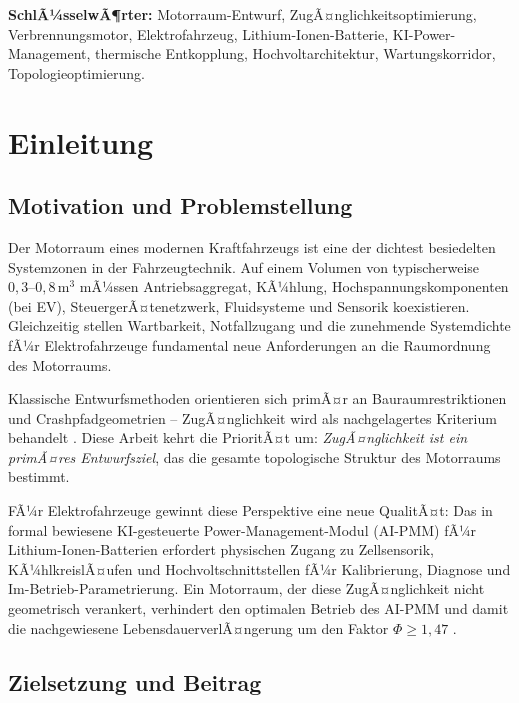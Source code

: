 ﻿\documentclass[12pt,a4paper]{article}
\begin{document}
\vspace{1cm}
\noindent\textbf{SchlÃ¼sselwÃ¶rter:} Motorraum-Entwurf, ZugÃ¤nglichkeitsoptimierung,
Verbrennungsmotor, Elektrofahrzeug, Lithium-Ionen-Batterie, KI-Power-Management,
thermische Entkopplung, Hochvoltarchitektur, Wartungskorridor, Topologieoptimierung.

\newpage
\tableofcontents
\newpage

\section{Einleitung}

\subsection{Motivation und Problemstellung}

Der Motorraum eines modernen Kraftfahrzeugs ist eine der dichtest besiedelten
Systemzonen in der Fahrzeugtechnik. Auf einem Volumen von typischerweise
$0{,}3\text{--}0{,}8\,\mathrm{m^3}$ mÃ¼ssen Antriebsaggregat, KÃ¼hlung,
Hochspannungskomponenten (bei EV), SteuergerÃ¤tenetzwerk, Fluidsysteme und
Sensorik koexistieren. Gleichzeitig stellen Wartbarkeit, Notfallzugang und
die zunehmende Systemdichte fÃ¼r Elektrofahrzeuge fundamental neue Anforderungen
an die Raumordnung des Motorraums.

Klassische Entwurfsmethoden orientieren sich primÃ¤r an Bauraumrestriktionen
und Crashpfadgeometrien -- ZugÃ¤nglichkeit wird als nachgelagertes Kriterium
behandelt \cite{HeiÃŸing2013}. Diese Arbeit kehrt die PrioritÃ¤t um:
\textit{ZugÃ¤nglichkeit ist ein primÃ¤res Entwurfsziel}, das die gesamte
topologische Struktur des Motorraums bestimmt.

FÃ¼r Elektrofahrzeuge gewinnt diese Perspektive eine neue QualitÃ¤t: Das in
\cite{Epp2026liion} formal bewiesene KI-gesteuerte Power-Management-Modul
(AI-PMM) fÃ¼r Lithium-Ionen-Batterien erfordert physischen Zugang zu Zellsensorik,
KÃ¼hlkreislÃ¤ufen und Hochvoltschnittstellen fÃ¼r Kalibrierung, Diagnose und
Im-Betrieb-Parametrierung. Ein Motorraum, der diese ZugÃ¤nglichkeit nicht
geometrisch verankert, verhindert den optimalen Betrieb des AI-PMM und
damit die nachgewiesene LebensdauerverlÃ¤ngerung um den Faktor $\Phi \geq 1{,}47$
\cite{Epp2026liion}.

\subsection{Zielsetzung und Beitrag}
\end{document}
